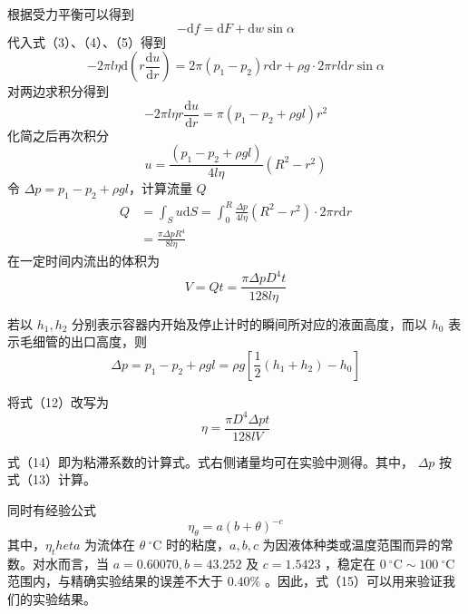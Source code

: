 \documentclass[12pt]{article}
\begin{document}
根据受力平衡可以得到
\begin{equation}
    -\mathrm df=\mathrm dF +\mathrm dw\sin\alpha
\end{equation}
代入式（3）、（4）、（5）得到
\begin{equation}
    -2\pi l\eta \mathrm d \left(r \frac{\mathrm du}{\mathrm dr} \right)=2\pi (p_1-p_2) r\mathrm dr+\rho g\cdot 2\pi rl\mathrm dr \sin\alpha
\end{equation}
对两边求积分得到
\begin{equation}
    -2\pi l\eta r\frac{\mathrm du}{\mathrm dr}=\pi \left(p_1-p_2+\rho gl \right) r^2
\end{equation}
化简之后再次积分
\begin{equation}
    u=\frac{(p_1-p_2+\rho gl)}{4l\eta}(R^2-r^2)
\end{equation}
令 $\Delta p=p_1-p_2+\rho gl$，计算流量 $Q$
\begin{align}
    Q&=\int_S u\mathrm dS=\int_{0}^{R} \frac{\Delta p}{4l\eta} (R^2-r^2)\cdot 2\pi r\mathrm dr\\
     &=\frac{\pi \Delta pR^4}{8l\eta}
\end{align}
在一定时间内流出的体积为
\begin{equation}
    V=Qt=\frac{\pi \Delta p D^4t}{128l\eta}
\end{equation}

若以 $h_1,h_2$ 分别表示容器内开始及停止计时的瞬间所对应的液面高度，而以 $h_0$ 表示毛细管的出口高度，则
\begin{equation}
    \Delta p=p_1-p_2+\rho gl=\rho g\left[\frac{1}{2}(h_1+h_2)-h_0\right]
\end{equation}

将式（12）改写为
\begin{equation}
    \eta=\frac{\pi D^4\Delta pt}{128lV}
\end{equation}

式（14）即为粘滞系数的计算式。式右侧诸量均可在实验中测得。其中， $\Delta p$ 按式（13）计算。

同时有经验公式
\begin{equation}
    \eta_\theta=a(b+\theta)^{-c}
\end{equation}
其中，$\eta_theta$ 为流体在 $\theta~^\circ\mathrm{C}$ 时的粘度，$a,b,c$ 为因液体种类或温度范围而异的常数。对水而言，当 $a=0.60070,b=43.252$ 及 $c=1.5423$ ，稳定在 $0~^\circ\mathrm{C}\sim 100~^\circ\mathrm{C}$ 范围内，与精确实验结果的误差不大于 $0.40\%$ 。因此，式（15）可以用来验证我们的实验结果。
\end{document}
